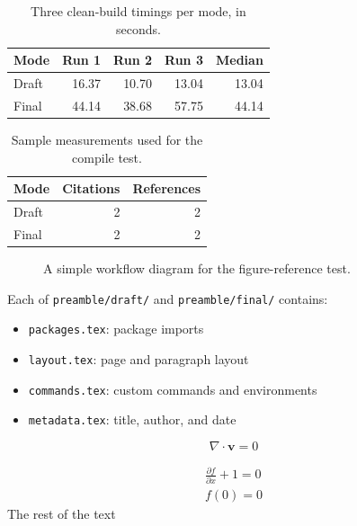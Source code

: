 \documentclass[11pt]{article}
\begin{document}
\begin{table}[htbp]
\centering
\caption{Three clean-build timings per mode, in seconds.}
\label{tab:compile-benchmark}
\begin{tabular}{lrrrr}
\hline
Mode & Run 1 & Run 2 & Run 3 & Median \\
\hline
Draft & 16.37 & 10.70 & 13.04 & 13.04 \\
Final & 44.14 & 38.68 & 57.75 & 44.14 \\
\hline
\end{tabular}
\end{table}

\begin{table}[htbp]
\centering
\caption{Sample measurements used for the compile test.}
\label{tab:sample-data}
\begin{tabular}{lrr}
\hline
Mode & Citations & References \\
\hline
Draft & 2 & 2 \\
Final & 2 & 2 \\
\hline
\end{tabular}
\end{table}

\begin{figure}[htbp]
\centering
{}
\caption{A simple workflow diagram for the figure-reference test.}
\label{fig:workflow}
\end{figure}

Each of \texttt{preamble/draft/} and \texttt{preamble/final/} contains:
\begin{itemize}
	\item \texttt{packages.tex}: package imports
	\item \texttt{layout.tex}: page and paragraph layout
	\item \texttt{commands.tex}: custom commands and environments
	\item \texttt{metadata.tex}: title, author, and date
\end{itemize}

\begin{equation}
    \label{eq:ns}
    \nabla \cdot \mathbf{v} = 0
\end{equation}

\begin{equation}
    \label{eq:test}
    \begin{aligned}
    \frac{\partial{f}}{\partial{x}}+1=0 \\
    f(0) = 0
    \end{aligned}
\end{equation}
The rest of the text
\printbibliography
\end{document}

